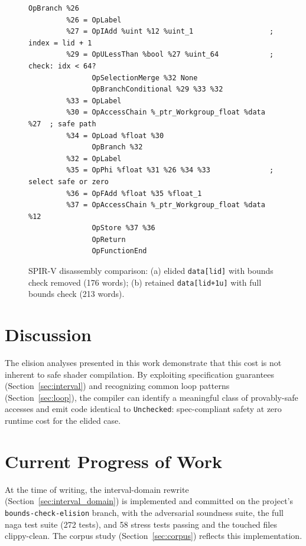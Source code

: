 \documentclass[11pt,a4paper]{article}
\begin{document}
\begin{figure}[h!]
\begin{lstlisting}[basicstyle=\ttfamily\tiny]
               OpBranch %26
         %26 = OpLabel
         %27 = OpIAdd %uint %12 %uint_1                  ; index = lid + 1
         %29 = OpULessThan %bool %27 %uint_64            ; check: idx < 64?
               OpSelectionMerge %32 None
               OpBranchConditional %29 %33 %32
         %33 = OpLabel
         %30 = OpAccessChain %_ptr_Workgroup_float %data %27  ; safe path
         %34 = OpLoad %float %30
               OpBranch %32
         %32 = OpLabel
         %35 = OpPhi %float %31 %26 %34 %33              ; select safe or zero
         %36 = OpFAdd %float %35 %float_1
         %37 = OpAccessChain %_ptr_Workgroup_float %data %12
               OpStore %37 %36
               OpReturn
               OpFunctionEnd
\end{lstlisting}
\caption{SPIR-V disassembly comparison: (a) elided \texttt{data[lid]} with
bounds check removed (176 words); (b) retained \texttt{data[lid+1u]} with
full bounds check (213 words).}
\label{fig:spv_combined}
\end{figure}

\clearpage
\section{Discussion}
\label{sec:discussion}

The elision analyses presented in this work demonstrate that this cost is not
inherent to safe shader compilation. By exploiting specification guarantees
(Section~\ref{sec:interval}) and recognizing common loop patterns
(Section~\ref{sec:loop}), the compiler can identify a meaningful class of
provably-safe accesses and emit code identical to
\texttt{Unchecked}: spec-compliant safety at zero runtime cost for the
elided case.

\section{Current Progress of Work}
\label{sec:future}

At the time of writing, the interval-domain rewrite
(Section~\ref{sec:interval_domain}) is implemented and committed on the
project's \texttt{bounds-check-elision} branch, with the adversarial
soundness suite, the full naga test suite (272 tests), and 58 stress tests
passing and the touched files clippy-clean. The corpus study
(Section~\ref{sec:corpus}) reflects this implementation.
\end{document}

